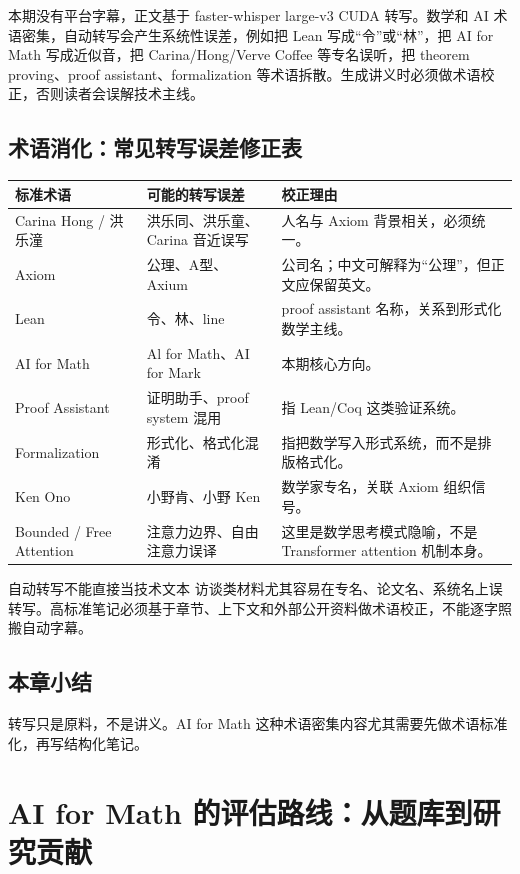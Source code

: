 \documentclass[a4paper]{article}
\begin{document}
本期没有平台字幕，正文基于 faster-whisper large-v3 CUDA 转写。数学和 AI 术语密集，自动转写会产生系统性误差，例如把 Lean 写成“令”或“林”，把 AI for Math 写成近似音，把 Carina/Hong/Verve Coffee 等专名误听，把 theorem proving、proof assistant、formalization 等术语拆散。生成讲义时必须做术语校正，否则读者会误解技术主线。

\subsection{术语消化：常见转写误差修正表}

\noindent\begin{longtable}{p{}p{}p{}}
\toprule
标准术语 & 可能的转写误差 & 校正理由 \\
\midrule
Carina Hong / 洪乐潼 & 洪乐同、洪乐童、Carina 音近误写 & 人名与 Axiom 背景相关，必须统一。 \\
Axiom & 公理、A型、Axium & 公司名；中文可解释为“公理”，但正文应保留英文。 \\
Lean & 令、林、line & proof assistant 名称，关系到形式化数学主线。 \\
AI for Math & Al for Math、AI for Mark & 本期核心方向。 \\
Proof Assistant & 证明助手、proof system 混用 & 指 Lean/Coq 这类验证系统。 \\
Formalization & 形式化、格式化混淆 & 指把数学写入形式系统，而不是排版格式化。 \\
Ken Ono & 小野肯、小野 Ken & 数学家专名，关联 Axiom 组织信号。 \\
Bounded / Free Attention & 注意力边界、自由注意力误译 & 这里是数学思考模式隐喻，不是 Transformer attention 机制本身。 \\
\bottomrule
\end{longtable}

\begin{warningbox}{自动转写不能直接当技术文本}
访谈类材料尤其容易在专名、论文名、系统名上误转写。高标准笔记必须基于章节、上下文和外部公开资料做术语校正，不能逐字照搬自动字幕。
\end{warningbox}

\subsection{本章小结}

转写只是原料，不是讲义。AI for Math 这种术语密集内容尤其需要先做术语标准化，再写结构化笔记。

\section{AI for Math 的评估路线：从题库到研究贡献}
\end{document}
